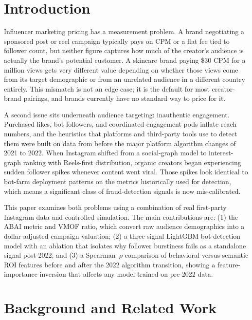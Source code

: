 \documentclass[conference]{IEEEtran}
\begin{document}
\section{Introduction}

Influencer marketing pricing has a measurement problem. A brand negotiating
a sponsored post or reel campaign typically pays on CPM or a flat fee tied
to follower count, but neither figure captures how much of the creator's
audience is actually the brand's potential customer. A skincare brand paying
\$30 CPM for a million views gets very different value depending on whether
those views come from its target demographic or from an unrelated audience
in a different country entirely. This mismatch is not an edge case; it is
the default for most creator-brand pairings, and brands currently have no
standard way to price for it.

A second issue sits underneath audience targeting: inauthentic engagement.
Purchased likes, bot followers, and coordinated engagement pods inflate
reach numbers, and the heuristics that platforms and third-party tools use
to detect them were built on data from before the major platform algorithm
changes of 2021 to 2022. When Instagram shifted from a social-graph model
to interest-graph ranking with Reels-first distribution, organic creators
began experiencing sudden follower spikes whenever content went viral. Those
spikes look identical to bot-farm deployment patterns on the metrics
historically used for detection, which means a significant class of
fraud-detection signals is now mis-calibrated.

This paper examines both problems using a combination of real first-party
Instagram data and controlled simulation. The main contributions are: (1) the
ABAI metric and VMOF ratio, which convert raw audience demographics into a
dollar-adjusted campaign valuation; (2) a three-signal LightGBM bot-detection
model with an ablation that isolates why follower burstiness fails as a
standalone signal post-2022; and (3) a Spearman~$\rho$ comparison of
behavioral versus semantic ROI features before and after the 2022 algorithm
transition, showing a feature-importance inversion that affects any model
trained on pre-2022 data.

\section{Background and Related Work}
\end{document}

